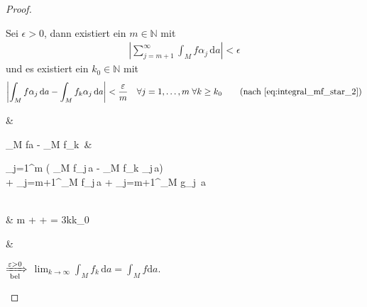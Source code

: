 \begin{proof}
\begin{enumerate}[label={zu \arabic*)},leftmargin=4em,start=4]
		Sei $\epsilon > 0$, dann existiert ein $m\in \mathbb{N}$ mit \begin{align*}
			\left\vert\sum_{j=m+1}^\infty \int_M f\alpha_j\,\mathrm{d}a \right\vert < \epsilon
		\end{align*}
		und es existiert ein $k_0\in\mathbb{N}$ mit \begin{align*}
			 \left\vert\int_M f\alpha_j\,\mathrm{d}a - \int_M f_k\alpha_j \,\mathrm{d}a \right\vert < \frac{\epsilon}{m}\quad\forall j=1,\dotsc,m \;\forall k\ge k_0\qquad \text{(nach \eqref{eq:integral_mf_star_2})}
		\end{align*}
		\begin{flalign*}
			\quad\Rightarrow\;\;&
			\begin{aligned}[t]
				\left\vert\int_M fa - \int_M f_k\, \right\vert &\le \begin{multlined}[t][0.7\linewidth]
				\left\lvert\sum_{j=1}^m \left( \int_M f\alpha_j\,a - \int_M f_k \alpha_j\,a\right)\right\vert \\ + \left\vert\sum_{j=m+1}^\infty \int_M f\alpha_j\,a \right\vert + \left\vert \sum_{j=m+1}^\infty \int_M g\alpha_j \,a\right\vert
				\end{multlined}\\
				& \le {}\cdot m + \epsilon + \epsilon = 3\epsilon\quad\forall k\ge k_0
			\end{aligned}&
		\end{flalign*}
		$\xRightarrow[\text{bel}]{\epsilon > 0}$ $\lim_{k\to\infty} \int_M f_k\,\mathrm{d}a = \int_M f\mathrm{d}a$.
	\end{enumerate}
\end{proof}